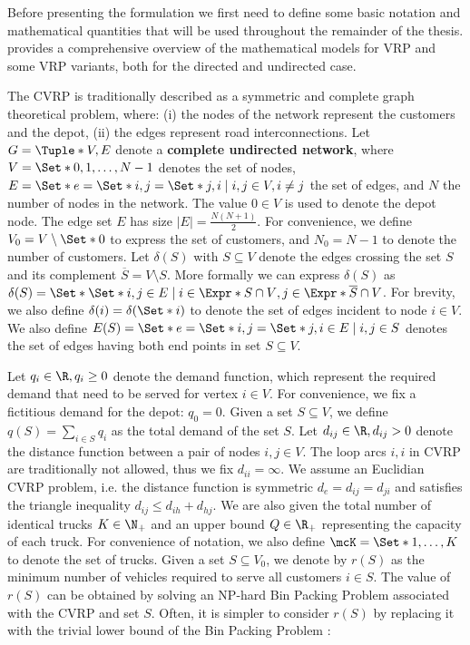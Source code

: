 Before presenting the formulation we first need to define some basic notation
and mathematical quantities that will be used throughout the remainder of the thesis.
\textcite{toth2002, toth2014} provides a comprehensive overview of the mathematical models
for VRP and some VRP variants, both for the directed and undirected case.

\medskip

The CVRP is traditionally described as a symmetric and complete graph theoretical problem,
where: (i) the nodes of the network represent the customers and the depot,
(ii) the edges represent road interconnections.
Let $G = \Tuple*{V, E}$ denote a \textbf{complete undirected network}, where $V = \Set*{0, 1, \dots, N - 1}$ denotes the set of nodes,
$E = \Set*{e = \Set*{i, j} = \Set*{j, i} \mid \allowbreak i,j \in V, \allowbreak i \ne j}$ the set of edges, and $N$ the number of nodes in the network.
The value $0 \in V$ is used to denote the depot node.
The edge set $E$ has size $|E| = \frac{N (N+1)}{2}$.
For convenience, we define $V_0 = V \setminus \Set*{0}$ to express the set of customers, and $N_0 = N - 1$ to denote the number of customers.
Let $\delta(S)$ with $S \subseteq V$ denote the edges crossing the set $S$ and its complement $\overline{S} = V \setminus S$.
More formally we can express $\delta(S)$ as $\delta(S) = \Set*{ \Set*{i, j} \in E \mid i \in \Expr*{S \cap V}, j \in \Expr*{ \overline{S} \cap V } }$.
For brevity, we also define $\delta(i) = \delta(\Set*{i})$ to denote the set of edges incident to node $i \in V$.
We also define $E(S) = \Set*{e = \Set*{i, j} = \Set*{j, i}\in E \mid i, j \in S}$ denotes the set of edges having both end points in set $S \subseteq V$.

Let $q_{i} \in \R, q_{i} \ge 0$ denote the demand function, which represent the required demand that need to be served for vertex $i \in V$.
For convenience, we fix a fictitious demand for the depot: $q_0 = 0$.
Given a set $S \subseteq V$, we define $q(S) = \sum_{i \in S} q_i$ as the total demand of the set $S$.
Let $d_{ij} \in \R, d_{ij} > 0$ denote the distance function between a pair of nodes  $i, j \in V$.
The loop arcs ${i, i}$ in CVRP are traditionally not allowed, thus we fix $d_{ii} = \infty$.
We assume an Euclidian CVRP problem, i.e. the distance function is symmetric $d_e = d_{ij} = d_{ji}$ and satisfies the triangle inequality $d_{ij} \le d_{ih} + d_{hj}$.
We are also given the total number of identical trucks $K \in \N_+$ and an upper bound $Q \in \R_+$ representing the capacity of each truck.
For convenience of notation, we also define $\mcK = \Set*{1, \dots, K}$ to denote the set of trucks.
Given a set $S \subseteq V_0$, we denote by $r(S)$ as the minimum number of vehicles required to serve all customers $i \in S$.
The value of $r(S)$ can be obtained by solving an NP-hard Bin Packing Problem associated with the CVRP and set $S$.
Often, it is simpler to consider $r(S)$ by replacing it with the trivial lower bound of the Bin Packing Problem \parencite{martello1990}:


